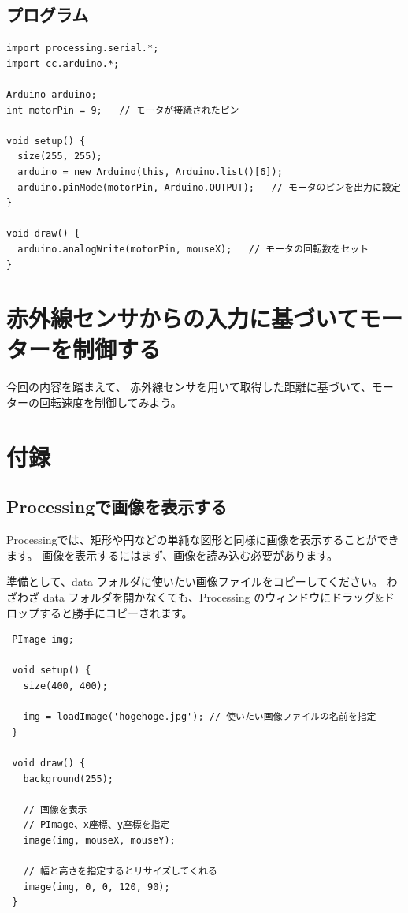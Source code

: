 \documentclass[11pt,a4paper]{jarticle}
\begin{document}
\subsection*{プログラム}
\begin{lstlisting}
import processing.serial.*;
import cc.arduino.*;
 
Arduino arduino;
int motorPin = 9;   // モータが接続されたピン
 
void setup() {
  size(255, 255);
  arduino = new Arduino(this, Arduino.list()[6]);
  arduino.pinMode(motorPin, Arduino.OUTPUT);   // モータのピンを出力に設定
}
 
void draw() {
  arduino.analogWrite(motorPin, mouseX);   // モータの回転数をセット
}
\end{lstlisting}


\section{赤外線センサからの入力に基づいてモーターを制御する}
今回の内容を踏まえて、
赤外線センサを用いて取得した距離に基づいて、モーターの回転速度を制御してみよう。

\newpage

\section*{付録}
\subsection*{Processingで画像を表示する}
Processingでは、矩形や円などの単純な図形と同様に画像を表示することができます。
画像を表示するにはまず、画像を読み込む必要があります。

準備として、data フォルダに使いたい画像ファイルをコピーしてください。
わざわざ data フォルダを開かなくても、Processing のウィンドウにドラッグ\&ドロップすると勝手にコピーされます。

\begin{lstlisting}
 PImage img;
 
 void setup() {
   size(400, 400);

   img = loadImage('hogehoge.jpg'); // 使いたい画像ファイルの名前を指定
 }

 void draw() {
   background(255);

   // 画像を表示
   // PImage、x座標、y座標を指定
   image(img, mouseX, mouseY);

   // 幅と高さを指定するとリサイズしてくれる
   image(img, 0, 0, 120, 90);
 }
\end{lstlisting}
\end{document}
